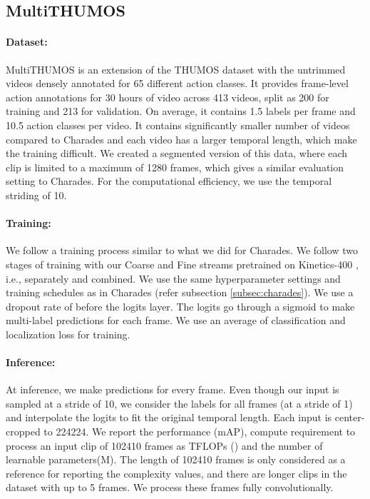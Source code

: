 \documentclass[final]{cvpr}
\begin{document}
\vspace{-1mm}
\subsection{MultiTHUMOS}
\label{subsec:multithumos}
\vspace{-1mm}

\paragraph{Dataset:} MultiTHUMOS \cite{yeung2018every} is an extension of the THUMOS \cite{jiang2014thumos} dataset with the untrimmed videos densely annotated for 65 different action classes. It provides frame-level action annotations for 30 hours of video across 413 videos, split as 200 for training and 213 for validation. On average, it contains 1.5 labels per frame and 10.5 action classes per video. It contains significantly smaller number of videos compared to Charades \cite{sigurdsson2016hollywood} and each video has a larger temporal length, which make the training difficult. We created a segmented version of this data, where each clip is limited to a maximum of 1280 frames, which gives a similar evaluation setting to Charades. For the computational efficiency, we use the temporal striding of 10. 

\vspace{-3pt}
\paragraph{Training:} We follow a training process similar to what we did for Charades. We follow two stages of training with our Coarse and Fine streams pretrained on Kinetics-400 \cite{kay2017kinetics}, i.e., separately and combined. We use the same hyperparameter settings and training schedules as in Charades (refer subsection \ref{subsec:charades}). We use a dropout rate of  before the logits layer. The logits go through a sigmoid to make multi-label predictions for each frame. We use an average of classification and localization loss for training.

\vspace{-3pt}
\paragraph{Inference:} At inference, we make predictions for every frame. Even though our input is sampled at a stride of 10, we consider the labels for all frames (at a stride of 1) and interpolate the logits to fit the original temporal length. Each input is center-cropped to 224224. We report the performance (mAP), compute requirement to process an input clip of 102410 frames as TFLOPs () and the number of learnable parameters(M). The length of 102410 frames is only considered as a reference for reporting the complexity values, and there are longer clips in the dataset with up to 5 frames. We process these frames fully convolutionally.
\end{document}
